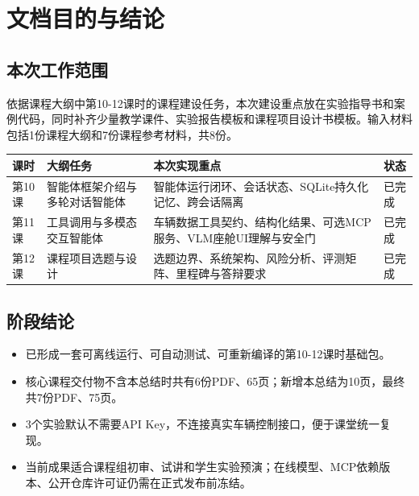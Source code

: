 \documentclass[UTF8,zihao=-4]{ctexart}
\begin{document}

\tableofcontents
\clearpage
{}

\section{文档目的与结论}


\subsection{本次工作范围}

依据课程大纲中第10-12课时的课程建设任务，本次建设重点放在实验指导书和案例代码，同时补齐少量教学课件、实验报告模板和课程项目设计书模板。输入材料包括1份课程大纲和7份课程参考材料，共8份。

\begin{table}[htbp]
\centering
\begin{tabularx}{\textwidth}{C{1.5cm} L{3.8cm} Y C{2.0cm}}
\toprule
课时 & 大纲任务 & 本次实现重点 & 状态\\
\midrule
第10课 & 智能体框架介绍与多轮对话智能体 &
智能体运行闭环、会话状态、SQLite持久化记忆、跨会话隔离 & \textcolor{CourseTeal}{已完成}\\
第11课 & 工具调用与多模态交互智能体 &
车辆数据工具契约、结构化结果、可选MCP服务、VLM座舱UI理解与安全门 & \textcolor{CourseTeal}{已完成}\\
第12课 & 课程项目选题与设计 &
选题边界、系统架构、风险分析、评测矩阵、里程碑与答辩要求 & \textcolor{CourseTeal}{已完成}\\
\bottomrule
\end{tabularx}
\end{table}

\subsection{阶段结论}

\begin{itemize}
  \item 已形成一套可离线运行、可自动测试、可重新编译的第10-12课时基础包。
  \item 核心课程交付物不含本总结时共有6份PDF、65页；新增本总结为10页，最终共7份PDF、75页。
  \item 3个实验默认不需要API Key，不连接真实车辆控制接口，便于课堂统一复现。
  \item 当前成果适合课程组初审、试讲和学生实验预演；在线模型、MCP依赖版本、公开仓库许可证仍需在正式发布前冻结。
\end{itemize}
\end{document}
